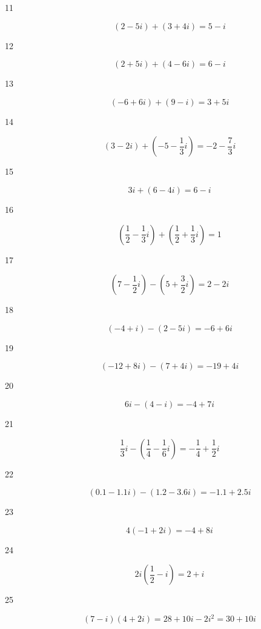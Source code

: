 \documentclass{exam}
\begin{document}
\begin{description}
    \item[11] 
      \[
        (2 - 5i) + (3 + 4i) = \boxed{5 - i}
      \]

    \item[12] 
      \[
        (2 + 5i) + (4 - 6i) = \boxed{6 - i}
      \]

    \item[13] 
      \[
        (-6 + 6i) + (9 - i) = \boxed{3 + 5i}
      \]

    \item[14] 
      \[
        (3 - 2i) + \left( -5 - \frac{1}{3} i \right) = \boxed{-2 - \frac{7}{3} i}
      \]

    \item[15] 
      \[
        3i + (6 - 4i) = \boxed{6 - i}
      \]

    \item[16] 
      \[
        \left( \frac{1}{2} - \frac{1}{3} i \right) + \left( \frac{1}{2} + \frac{1}{3} i \right) = \boxed{1}
      \]

    \item[17] 
      \[
        \left( 7 - \frac{1}{2} i \right) - \left( 5 + \frac{3}{2} i \right) = \boxed{2 - 2i}
      \]

    \item[18] 
      \[
        (-4 + i) - (2 - 5i) = \boxed{-6 + 6i}
      \]

    \item[19] 
      \[
        (-12 + 8i) - (7 + 4i) = \boxed{-19 + 4i}
      \]

    \item[20] 
      \[
        6i - (4 - i) = \boxed{-4 + 7i}
      \]

    \item[21] 
      \[
        \frac{1}{3} i - \left( \frac{1}{4} - \frac{1}{6} i \right) = \boxed{- \frac{1}{4} + \frac{1}{2}i}
      \]

    \item[22] 
      \[
        (0.1 - 1.1 i) - (1.2 - 3.6 i) = \boxed{-1.1 + 2.5i}
      \]

    \item[23] 
      \[
        4(-1 + 2i) = \boxed{-4 + 8i}
      \]

    \item[24] 
      \[
        2i \left( \frac{1}{2} - i \right) = \boxed{2 + i}
      \]

    \item[25] 
      \[
        (7 - i)(4 + 2i) = 28 + 10i - 2i^2 = \boxed{30 + 10i}
      \]


\end{description}
\end{document}

